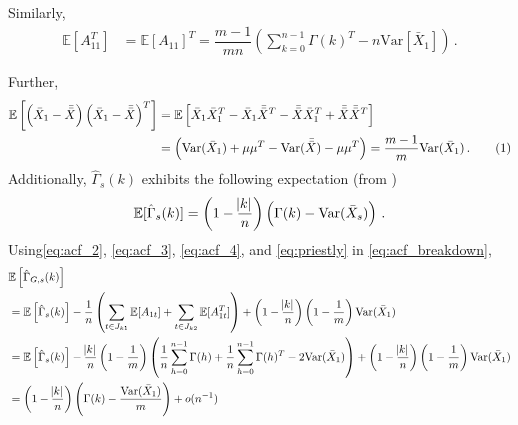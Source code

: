 \documentclass[11pt]{article}
\newcommand{\E}{\mathbb{E}}
\newcommand{\Var}{\text{Var}}
\newcommand\numberthis{\addtocounter{equation}{1}\tag{\theequation}}
\theoremstyle{remark}
\begin{document}
%
Similarly,
\begin{align}
\label{eq:acf_3}
    \mathbb{E} \left[ A_{11}^T \right] &= \mathbb{E}\left[ A_{11}\right]^T = \dfrac{m-1}{mn}\left(\sum_{k=0}^{n-1}\Gamma(k)^T - n\text{Var}\left[\bar{X}_1 \right] \right)\,.
\end{align}


Further,
\begin{align*}
\mathbb{E}\left[ \left(\bar{X}_{1} - \bar{\bar{X}} \right)  \left(\bar{X}_{1} - \bar{\bar{X}} \right)^{T}\right] &= \mathbb{E}\left[ \bar{X}_{1}\bar{X}_{1}^{T} - \bar{X}_{1}\bar{\bar{X}}^{T} - \bar{\bar{X}} \bar{X}_{1}^{T} + \bar{\bar{X}}\bar{\bar{X}}^{T}\right]\\
&= \left(\Var(\bar{X}_{1}) + \mu\mu^{T} - \Var(\bar{\bar{X}}) - \mu\mu^{T}\right)= \dfrac{m-1}{m}\Var(\bar{X}_1)\,. \numberthis \label{eq:acf_4}
\end{align*}
%
Additionally, $\hat{\Gamma}_s(k)$ exhibits the following expectation (from \cite{priestley1981spectral})
 \begin{equation} \label{eq:priestly}
     \mathbb{E}[\hat{\Gamma}_s(k)] = \left(1- \dfrac{\abs{k}}{n}\right)\left(\Gamma(k) - \Var{(\bar{X}_s)}
 \right)\,.
 \end{equation}
%
Using\eqref{eq:acf_2}, \eqref{eq:acf_3}, \eqref{eq:acf_4}, and  \eqref{eq:priestly} in \eqref{eq:acf_breakdown},
\begin{align*}
    & \E \left[\hat{\Gamma}_{G,s}(k) \right] \\
    &= \mathbb{E}\left[\hat{\Gamma}_{s}(k)\right] - \dfrac{1}{n} \left(\sum\limits_{t \in J_{k1}}\mathbb{E}[A_{1t}] + \sum\limits_{t \in J_{k2}}\mathbb{E}[A_{1t}^T] \right) + \left(1- \dfrac{\abs{k}}{n}\right)\left(1-\dfrac{1}{m}\right)\Var(\bar{X}_1)\\
    &= \mathbb{E}\left[\hat{\Gamma}_{s}(k)\right] - \dfrac{\abs{k}}{n}\left(1-\dfrac{1}{m}\right)\left(\dfrac{1}{n}\sum_{h=0}^{n-1}\Gamma(h) + \dfrac{1}{n}\sum_{h=0}^{n-1}\Gamma(h)^T - 2 \Var(\bar{X}_1)\right) + \left(1- \dfrac{\abs{k}}{n}\right)\left(1-\dfrac{1}{m}\right)\Var(\bar{X}_1)\\
   &= \left(1- \dfrac{\abs{k}}{n}\right)\left( \Gamma(k) - \dfrac{\Var (\bar{X}_1)}{m} \right) + o(n^{-1})%
\end{align*}
%
\end{document}
